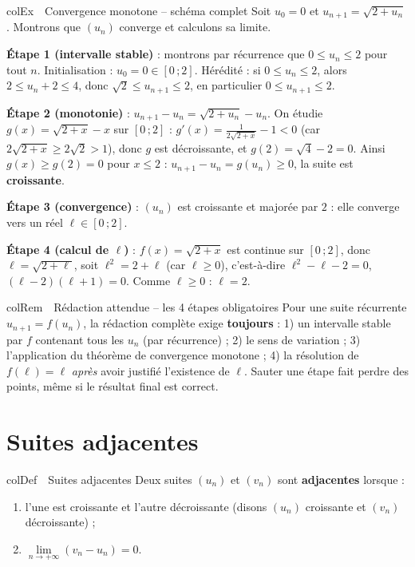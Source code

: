 \documentclass[11pt,a4paper]{article}
\newenvironment{definition}[1][Définition]
  {\begin{fiche}{colDef}{\ding{110}~~#1}}{\end{fiche}}
\newenvironment{exemple}[1][Exemple]
  {\begin{fiche}{colEx}{\ding{217}~~#1}}{\end{fiche}}
\newenvironment{remarque}[1][Remarque]
  {\begin{fiche}{colRem}{\ding{43}~~#1}}{\end{fiche}}
\begin{document}
\begin{exemple}[Convergence monotone -- schéma complet]
Soit $u_0 = 0$ et $u_{n+1} = \sqrt{2 + u_n}$. Montrons que $(u_n)$ converge et calculons sa limite.

\smallskip
\textbf{Étape 1 (intervalle stable)} : montrons par récurrence que $0 \leq u_n \leq 2$ pour tout $n$. Initialisation : $u_0 = 0 \in [0\,;2]$. Hérédité : si $0 \leq u_n \leq 2$, alors $2 \leq u_n + 2 \leq 4$, donc $\sqrt{2} \leq u_{n+1} \leq 2$, en particulier $0 \leq u_{n+1} \leq 2$.

\smallskip
\textbf{Étape 2 (monotonie)} : $u_{n+1} - u_n = \sqrt{2+u_n} - u_n$. On étudie $g(x) = \sqrt{2+x} - x$ sur $[0\,;2]$ : $g'(x) = \frac{1}{2\sqrt{2+x}} - 1 < 0$ (car $2\sqrt{2+x} \geq 2\sqrt{2} > 1$), donc $g$ est décroissante, et $g(2) = \sqrt{4} - 2 = 0$. Ainsi $g(x) \geq g(2) = 0$ pour $x \leq 2$ : $u_{n+1} - u_n = g(u_n) \geq 0$, la suite est \textbf{croissante}.

\smallskip
\textbf{Étape 3 (convergence)} : $(u_n)$ est croissante et majorée par $2$ : elle converge vers un réel $\ell \in [0\,;2]$.

\smallskip
\textbf{Étape 4 (calcul de $\ell$)} : $f(x) = \sqrt{2+x}$ est continue sur $[0\,;2]$, donc $\ell = \sqrt{2+\ell}$, soit $\ell^2 = 2 + \ell$ (car $\ell \geq 0$), c'est-à-dire $\ell^2 - \ell - 2 = 0$, $(\ell-2)(\ell+1)=0$. Comme $\ell \geq 0$ : $\boxed{\ell = 2}$.
\end{exemple}

\begin{remarque}[Rédaction attendue -- les 4 étapes obligatoires]
Pour une suite récurrente $u_{n+1} = f(u_n)$, la rédaction complète exige \textbf{toujours} : 1) un intervalle stable par $f$ contenant tous les $u_n$ (par récurrence) ; 2) le sens de variation ; 3) l'application du théorème de convergence monotone ; 4) la résolution de $f(\ell) = \ell$ \emph{après} avoir justifié l'existence de $\ell$. Sauter une étape fait perdre des points, même si le résultat final est correct.
\end{remarque}

\section{Suites adjacentes}

\begin{definition}[Suites adjacentes]
Deux suites $(u_n)$ et $(v_n)$ sont \textbf{adjacentes} lorsque :
\begin{enumerate}[leftmargin=7mm, itemsep=0.5mm]
  \item l'une est croissante et l'autre décroissante (disons $(u_n)$ croissante et $(v_n)$ décroissante) ;
  \item $\lim\limits_{n\to+\infty}(v_n-u_n)=0$.
\end{enumerate}
\end{definition}
\end{document}
